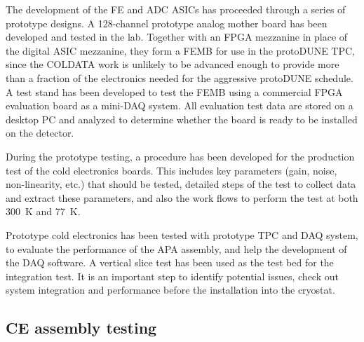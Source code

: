 The development of the FE and ADC ASICs has proceeded through a series of prototype designs.
A 128-channel prototype analog mother board has been developed and tested in the lab.
Together with an FPGA mezzanine in place of the digital ASIC mezzanine,
they form a FEMB for use in the protoDUNE TPC,
since the COLDATA work is unlikely to be advanced enough to
provide more than a fraction of the electronics needed for the aggressive protoDUNE schedule.
A test stand has been developed to test the FEMB
using a commercial FPGA evaluation board as a mini-DAQ system.
All evaluation test data are stored on a desktop PC and analyzed to
determine whether the board is ready to be installed on the detector.

During the prototype testing, a procedure has been developed for the production test of the cold electronics boards.
This includes key parameters (gain, noise, non-linearity, etc.) that should be tested,
detailed steps of the test to collect data and extract these parameters,
and also the work flows to perform the test at both 300~K and 77~K.

Prototype cold electronics has been tested with prototype TPC and DAQ system,
to evaluate the performance of the APA assembly, and help the development of the DAQ software.
A vertical slice test has been used as the test bed for the integration test.
It is an important step to identify potential issues, check out system integration and performance
before the installation into the cryostat.

\subsection{CE assembly testing}
\label{subsubsec:ce_install_assembly}

